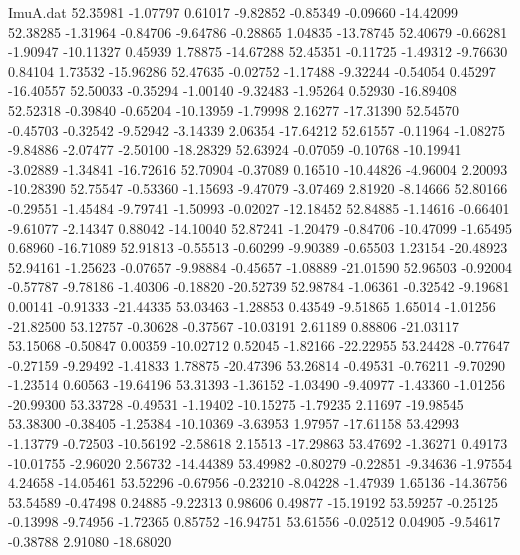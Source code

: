 \begin{filecontents}{ImuA.dat}
  52.35981   -1.07797    0.61017   -9.82852   -0.85349   -0.09660  -14.42099
  52.38285   -1.31964   -0.84706   -9.64786   -0.28865    1.04835  -13.78745
  52.40679   -0.66281   -1.90947  -10.11327    0.45939    1.78875  -14.67288
  52.45351   -0.11725   -1.49312   -9.76630    0.84104    1.73532  -15.96286
  52.47635   -0.02752   -1.17488   -9.32244   -0.54054    0.45297  -16.40557
  52.50033   -0.35294   -1.00140   -9.32483   -1.95264    0.52930  -16.89408
  52.52318   -0.39840   -0.65204  -10.13959   -1.79998    2.16277  -17.31390
  52.54570   -0.45703   -0.32542   -9.52942   -3.14339    2.06354  -17.64212
  52.61557   -0.11964   -1.08275   -9.84886   -2.07477   -2.50100  -18.28329
  52.63924   -0.07059   -0.10768  -10.19941   -3.02889   -1.34841  -16.72616
  52.70904   -0.37089    0.16510  -10.44826   -4.96004    2.20093  -10.28390
  52.75547   -0.53360   -1.15693   -9.47079   -3.07469    2.81920   -8.14666
  52.80166   -0.29551   -1.45484   -9.79741   -1.50993   -0.02027  -12.18452
  52.84885   -1.14616   -0.66401   -9.61077   -2.14347    0.88042  -14.10040
  52.87241   -1.20479   -0.84706  -10.47099   -1.65495    0.68960  -16.71089
  52.91813   -0.55513   -0.60299   -9.90389   -0.65503    1.23154  -20.48923
  52.94161   -1.25623   -0.07657   -9.98884   -0.45657   -1.08889  -21.01590
  52.96503   -0.92004   -0.57787   -9.78186   -1.40306   -0.18820  -20.52739
  52.98784   -1.06361   -0.32542   -9.19681    0.00141   -0.91333  -21.44335
  53.03463   -1.28853    0.43549   -9.51865    1.65014   -1.01256  -21.82500
  53.12757   -0.30628   -0.37567  -10.03191    2.61189    0.88806  -21.03117
  53.15068   -0.50847    0.00359  -10.02712    0.52045   -1.82166  -22.22955
  53.24428   -0.77647   -0.27159   -9.29492   -1.41833    1.78875  -20.47396
  53.26814   -0.49531   -0.76211   -9.70290   -1.23514    0.60563  -19.64196
  53.31393   -1.36152   -1.03490   -9.40977   -1.43360   -1.01256  -20.99300
  53.33728   -0.49531   -1.19402  -10.15275   -1.79235    2.11697  -19.98545
  53.38300   -0.38405   -1.25384  -10.10369   -3.63953    1.97957  -17.61158
  53.42993   -1.13779   -0.72503  -10.56192   -2.58618    2.15513  -17.29863
  53.47692   -1.36271    0.49173  -10.01755   -2.96020    2.56732  -14.44389
  53.49982   -0.80279   -0.22851   -9.34636   -1.97554    4.24658  -14.05461
  53.52296   -0.67956   -0.23210   -8.04228   -1.47939    1.65136  -14.36756
  53.54589   -0.47498    0.24885   -9.22313    0.98606    0.49877  -15.19192
  53.59257   -0.25125   -0.13998   -9.74956   -1.72365    0.85752  -16.94751
  53.61556   -0.02512    0.04905   -9.54617   -0.38788    2.91080  -18.68020

\end{filecontents}
